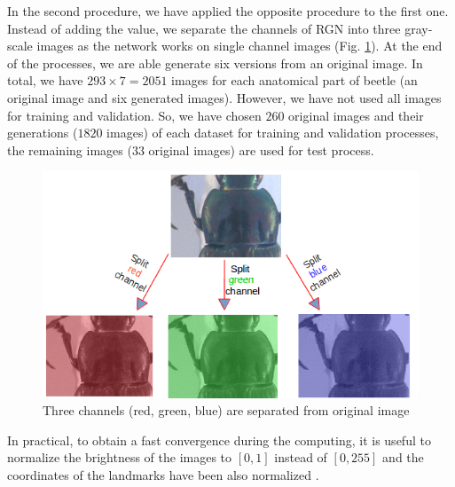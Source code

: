 \documentclass[review]{elsarticle}
\begin{document}
In the second procedure, we have applied the opposite procedure to the first one. Instead of adding the value, we separate the channels of RGN into three gray-scale images as the network works on single channel images (Fig. \ref{figaug2}). At the end of the processes, we are able generate six versions from an original image. In total, we have $293 \times 7 = 2051$ images for each anatomical part of beetle (an original image and six generated images). However, we have not used all images for training and validation. So, we have chosen $260$ original images and their generations ($1820$ images) of each dataset for training and validation processes, the remaining images ($33$ original images) are used for test process.

\begin{figure}[h]
	\centering
	\includegraphics[scale=0.35]{images/sp_channels}
	\caption{Three channels (red, green, blue) are separated from original image}
	\label{figaug2}
\end{figure}

In practical, to obtain a fast convergence during the computing, it is useful to normalize the brightness of the images to $[0,1]$ instead of $[0, 255]$ and the coordinates of the landmarks have been also normalized \cite{lecun2012efficient}.
\end{document}
